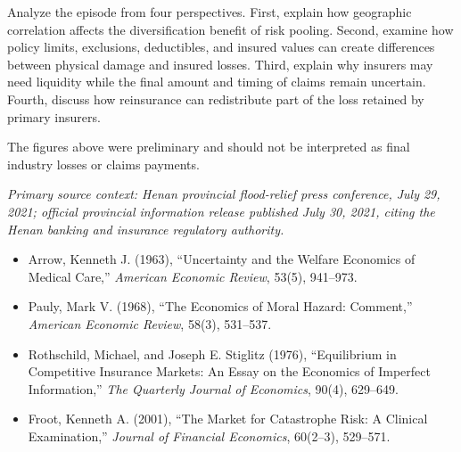 Analyze the episode from four perspectives. First, explain how geographic correlation affects the diversification benefit of risk pooling. Second, examine how policy limits, exclusions, deductibles, and insured values can create differences between physical damage and insured losses. Third, explain why insurers may need liquidity while the final amount and timing of claims remain uncertain. Fourth, discuss how reinsurance can redistribute part of the loss retained by primary insurers.

The figures above were preliminary and should not be interpreted as final industry losses or claims payments.

\emph{Primary source context: Henan provincial flood-relief press conference, July 29, 2021; official provincial information release published July 30, 2021, citing the Henan banking and insurance regulatory authority.}




\begin{itemize}

\item Arrow, Kenneth J. (1963),
``Uncertainty and the Welfare Economics of Medical Care,''
\emph{American Economic Review}, 53(5), 941--973.

\item Pauly, Mark V. (1968),
``The Economics of Moral Hazard: Comment,''
\emph{American Economic Review}, 58(3), 531--537.

\item Rothschild, Michael, and Joseph E. Stiglitz (1976),
``Equilibrium in Competitive Insurance Markets: An Essay on the Economics of Imperfect Information,''
\emph{The Quarterly Journal of Economics}, 90(4), 629--649.

\item Froot, Kenneth A. (2001),
``The Market for Catastrophe Risk: A Clinical Examination,''
\emph{Journal of Financial Economics}, 60(2--3), 529--571.

\end{itemize}


